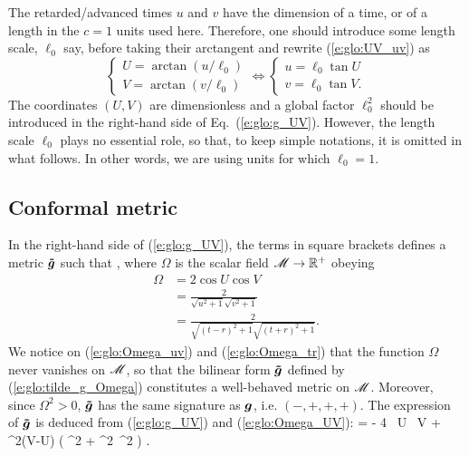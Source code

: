 \begin{remark}
The retarded/advanced times $u$ and $v$ have the dimension of a time, or of a
length in the $c=1$ units used here. Therefore, one should introduce
some length scale, $\ell_0$ say, before taking their arctangent and rewrite
(\ref{e:glo:UV_uv}) as
\[
    \left\{ \begin{array}{l}
    U = \arctan (u/\ell_0) \\
    V = \arctan (v/\ell_0)
    \end{array} \right.
    \iff
   \left\{ \begin{array}{l}
    u = \ell_0 \tan U \\
    v = \ell_0 \tan V .
    \end{array} \right.
\]
The coordinates $(U,V)$ are dimensionless and a global factor $\ell_0^2$ should be
introduced in the right-hand side of Eq.~(\ref{e:glo:g_UV}).
However, the length scale $\ell_0$ plays no essential role,
so that, to keep simple notations,
it is omitted in what follows. In other words, we are using units for
which $\ell_0=1$.
\end{remark}

\subsection{Conformal metric} \label{s:glo:conf_metric}

In the right-hand side of (\ref{e:glo:g_UV}),
the terms in square brackets defines a metric
$\bm{\tilde{g}}$ such that
\be \label{e:glo:tilde_g_Omega}
     ,
\ee
where $\Omega$ is the scalar field $\mathscr{M} \rightarrow \mathbb{R}^+$ obeying
\begin{subequations}
\begin{align}
    \Omega & =  2 \cos U \cos V \label{e:glo:Omega_UV} \\
           & =  \frac{2}{\sqrt{u^2+1}\sqrt{v^2+1}} \label{e:glo:Omega_uv}\\
           & =  \frac{2}{\sqrt{(t-r)^2+1}\sqrt{(t+r)^2+1}} . \label{e:glo:Omega_tr}
\end{align}
\end{subequations}
We notice on (\ref{e:glo:Omega_uv}) and (\ref{e:glo:Omega_tr}) that the function
$\Omega$ never vanishes on $\mathscr{M}$, so that the bilinear form $\bm{\tilde{g}}$ defined by
(\ref{e:glo:tilde_g_Omega}) constitutes a well-behaved metric on $\mathscr{M}$.
Moreover, since $\Omega^2 > 0$, $\bm{\tilde{g}}$ has the same signature as
$\bm{g}$, i.e. $(-,+,+,+)$.
The expression of $\bm{\tilde{g}}$ is deduced from (\ref{e:glo:g_UV})
and (\ref{e:glo:Omega_UV}):
\be \label{e:glo:tg_UV}
     =  - 4 \, \dd U \, \dd V
        + \sin^2(V-U) \left(  \dd\th^2 + \sin^2\th \, \dd\ph^2 \right) .
\ee

